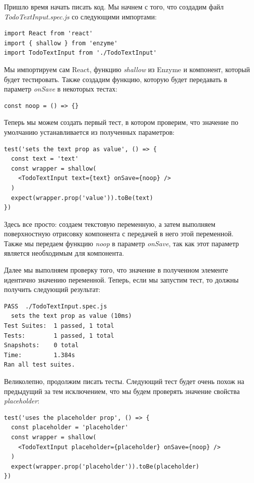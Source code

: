 Пришло время начать писать код. Мы начнем с того, что создадим файл \textit{TodoTextInput.spec.js} со следующими импортами:

\begin{lstlisting}
import React from 'react'
import { shallow } from 'enzyme'
import TodoTextInput from './TodoTextInput'
\end{lstlisting}

Мы импортируем сам React, функцию \textit{shallow} из Enzyme и компонент, который будет тестировать. Также создадим функцию, которую будет передавать в параметр \textit{onSave} в некоторых тестах:

\begin{lstlisting}
const noop = () => {}
\end{lstlisting}

Теперь мы можем создать первый тест, в котором проверим, что значение по умолчанию устанавливается из полученных параметров:

\begin{lstlisting}
test('sets the text prop as value', () => {
  const text = 'text'
  const wrapper = shallow(
    <TodoTextInput text={text} onSave={noop} />
  )
  expect(wrapper.prop('value')).toBe(text)
})
\end{lstlisting}

Здесь все просто: создаем текстовую переменную, а затем выполняем поверхностную отрисовку компонента с передачей в него этой переменной. Также мы передаем функцию \textit{noop} в параметр \textit{onSave}, так как этот параметр является необходимым для компонента.

Далее мы выполняем проверку того, что значение в полученном элементе идентично значению переменной. Теперь, если мы запустим тест, то должны получить следующий результат:

\begin{lstlisting}
PASS  ./TodoTextInput.spec.js
  sets the text prop as value (10ms)
Test Suites:  1 passed, 1 total
Tests:        1 passed, 1 total
Snapshots:    0 total
Time:         1.384s
Ran all test suites.
\end{lstlisting}

Великолепно, продолжим писать тесты. Следующий тест будет очень похож на предыдущий за тем исключением, что мы будем проверять значение свойства \textit{placeholder}:

\begin{lstlisting}
test('uses the placeholder prop', () => {
  const placeholder = 'placeholder'
  const wrapper = shallow(
    <TodoTextInput placeholder={placeholder} onSave={noop} />
  )
  expect(wrapper.prop('placeholder')).toBe(placeholder)
})
\end{lstlisting}


